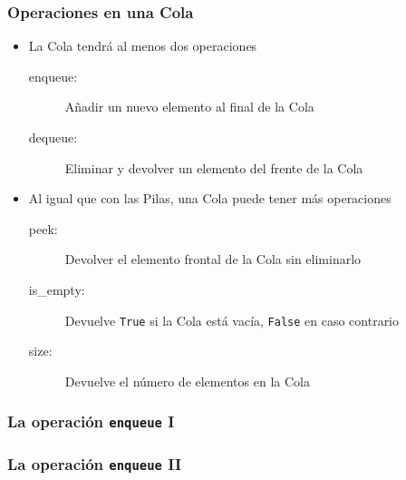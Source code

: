\documentclass[11pt]{beamer}
\begin{document}
\begin{frame}\frametitle{Operaciones en una Cola}
\begin{itemize}
\item La Cola tendrá al menos dos operaciones
    \begin{description}
    \item[enqueue:] Añadir un nuevo elemento al final de la Cola
    \item[dequeue:] Eliminar y devolver un elemento del frente de la Cola
    \end{description}
\item Al igual que con las Pilas, una Cola puede tener más operaciones
    \begin{description}
    \item[peek:] Devolver el elemento frontal de la Cola sin eliminarlo
    \item[is\_empty:] Devuelve \lstinline|True| si la Cola está vacía, \lstinline|False| en caso contrario
    \item[size:] Devuelve el número de elementos en la Cola
    \end{description}
\end{itemize}
\end{frame}

\begin{frame}\frametitle{La operación \texttt{enqueue} I}

\begin{center}
\end{center}
\end{frame}

\begin{frame}\frametitle{La operación \texttt{enqueue} II}
\begin{center}
\end{center}
\end{frame}
\end{document}
